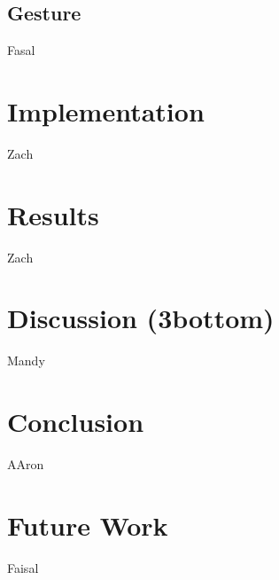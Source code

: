 \documentclass{article}
\begin{document}
		\subsection{Gesture}
			Fasal

	\section{Implementation}
		Zach

	\section{Results}
		Zach

	\section{Discussion (3bottom)}
		Mandy

	\section{Conclusion}
		AAron

	\section{Future Work}
		Faisal

	
	
	
\end{document}
